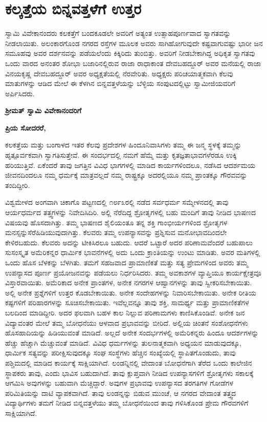 
\chapter{ಕಲ್ಕತ್ತೆಯ ಬಿನ್ನವತ್ತಳೆಗೆ ಉತ್ತರ}

ಸ್ವಾಮಿ ವಿವೇಕಾನಂದರು ಕಲಕತ್ತೆಗೆ ಬಂದಕೂಡಲೇ ಅವರಿಗೆ ಅತ್ಯಂತ ಉತ್ಸಾಹಪೂರ್ಣವಾದ ಸ್ವಾಗತವನ್ನು ನೀಡಲಾಯಿತು. ಅಲಂಕಾರಗೊಂಡ ನಗರದ ರಸ್ತೆಗಳ ಮೂಲಕ ಅವರು ಸಾಗಿಹೋಗುವುದೇ ಕಷ್ಟವಾಗುವಷ್ಟು ಭಾರೀ ಜನ ಸಮೂಹವು ಅವರ ದರ್ಶನವನ್ನು ಪಡೆಯಲೆಂದು ಕಿಕ್ಕಿರಿದು ತುಂಬಿತ್ತು. ಅವರಿಗೆ ನೀಡಬೇಕಾಗಿದ್ದ ಅಧಿಕೃತ ಸ್ವಾಗತವು ಒಂದು ವಾರದ ಅನಂತರ ಶೋಭಾ ಬಜಾರಿನಲ್ಲಿರುವ ರಾಜಾ ರಾಧಾಕಾಂತ ದೇವಬಹದ್ದೂರ್​ ಅವರ ಮನೆಯಲ್ಲಿ ರಾಜಾ ವಿನಯಕೃಷ್ಣ ದೇವಬಹದ್ದೂರ್​ ಅವರ ಅಧ್ಯಕ್ಷತೆಯಲ್ಲಿ ನೆರ\-ವೇರಿತು. ಅಧ್ಯಕ್ಷರು ಪರಿಚಯಾತ್ಮಕವಾಗಿ ಕೆಲವು ಮಾತುಗಳನ್ನು ಆಡಿದ ಮೇಲೆ ಈ ಕೆಳಗಿನ ಬಿನ್ನವತ್ತಳೆಯನ್ನು ಬೆಳ್ಳಿಯ ಸಂಪುಟದಲ್ಲಿಟ್ಟು ಸ್ವಾಮೀಜಿಯವರಿಗೆ ಅರ್ಪಿಸಿದರು.

\textbf{ಶ‍್ರೀಮತ್​ ಸ್ವಾಮಿ ವಿವೇಕಾನಂದರಿಗೆ}

\textbf{ಪ್ರಿಯ ಸೋದರರೆ,}

ಕಲಕತ್ತೆಯ ಮತ್ತು ಬಂಗಾಳದ ಇತರ ಕೆಲವು ಪ್ರದೇಶಗಳ ಹಿಂದೂನಿವಾಸಿಗಳು ತಮ್ಮ ಈ ಜನ್ಮ ಸ್ಥಳಕ್ಕೆ ತಮ್ಮನ್ನು ಹೃತ್ಪೂರ್ವಕವಾಗಿ ಸ್ವಾಗತಿಸುತ್ತೇವೆ. ಈ ಸಂದರ್ಭದಲ್ಲಿ ನಮಗೆ ಹೆಮ್ಮೆ ಮತ್ತು ಕೃತಜ್ಞತಾಭಾವಗಳೆರಡೂ ಉಕ್ಕಿ ಹರಿಯುತ್ತಿವೆ. ಏಕೆಂದರೆ ತಾವು ಜಗತ್ತಿನ ವಿವಿಧ ಭಾಗಗಳಲ್ಲಿ ಮಾಡಿದ ಕಾರ್ಯಗಳಿಂದಲೂ, ನಡೆಸಿದ ಆದರ್ಶಮಯ ಜೀವನದಿಂದಲೂ ನಮ್ಮ ಧರ್ಮಕ್ಕೆ ಮಾತ್ರವಲ್ಲದೆ ನಮ್ಮ ರಾಷ್ಟ್ರಕ್ಕೂ ಅದರಲ್ಲಿಯೂ ನಮ್ಮ ಪ್ರಾಂತಕ್ಕೂ ಗೌರವವನ್ನು ತಂದಿದ್ದೀರಿ.

ವಿಶ್ವಮೇಳದ ಅಂಗವಾಗಿ ಚಿಕಾಗೊ ಪಟ್ಟಣದಲ್ಲಿ ೧೮೯೩ರಲ್ಲಿ ನಡೆದ ಸರ್ವಧರ್ಮ ಸಮ್ಮೇಳನದಲ್ಲಿ ತಾವು ಆರ್ಯಧರ್ಮದ ತತ್ತ್ವಗಳನ್ನು ನಿವೇದಿಸಿದಿರಿ. ಅಲ್ಲಿ ನೆರೆದಿದ್ದ ಶ್ರೋತೃಗಳಲ್ಲಿ ಬಹು ಮಂದಿಗೆ ತಾವು ನೀಡಿದ ಭಾಷಣದ ವಿಷಯವು ಹೊಸದಾಗಿತ್ತು. ತಮ್ಮ ಭಾಷಣದ ಶೈಲಿಯಂತೂ ತನ್ನ ಶಕ್ತಿ ಗಾಂಭೀರ್ಯಗಳಿಂದ ಶ್ರೋತೃಗಳ ಮನಸ್ಸನ್ನು\break ಸೆರೆಹಿಡಿಯುವುದಾಗಿತ್ತು. ಕೆಲವರು ತಮ್ಮ ಉಪನ್ಯಾಸವನ್ನು ಪ್ರಶ್ನಿಸುವ ಮನೋಭಾವದಿಂದಲೇ ಕೇಳಿರಬಹುದು. ಕೆಲವರು ಅದನ್ನು ಟೀಕಿಸಿರಲೂ ಬಹುದು. ಆದರೆ ಒಟ್ಟಾರೆ ಅದರ ಪರಿಣಾಮವೆಂದರೆ ಬಹುಪಾಲು ಸುಸಂಸ್ಕೃತ ಅಮೆರಿಕನ್ನರ ಧಾರ್ಮಿಕ ಭಾವನೆಗಳಲ್ಲಿ ಅದು ಒಂದು ಕ್ರಾಂತಿಯನ್ನು ಉಂಟು ಮಾಡಿತು. ಅವರ ಮತಿಗಳಲ್ಲಿ ಒಂದು ಹೊಸ ಬೆಳಕನ್ನು ಬೆಳಗಿತು. ತಮಗೆ ಸಹಜವಾದ ಪ್ರಾಮಾಣಿಕತೆ ಮತ್ತು ಸತ್ಯ ಪ್ರೇಮಗಳಿಂದ ಅವರು ತಮ್ಮ ಉಪನ್ಯಾಸದ ಪೂರ್ಣ ಪ್ರಯೋಜನವನ್ನು ಪಡೆಯಲು ನಿರ್ಧರಿಸಿದರು. ತಮ್ಮ ಅವಕಾಶಗಳ ವ್ಯಾಪ್ತಿಯೂ ಕಾರ್ಯಕ್ಷೇತ್ರವೂ ವಿಸ್ತಾರವಾಯಿತು. ಅಮೆರಿಕಾದ ಅನೇಕ ಪ್ರಾಂತಗಳ, ಅನೇಕ ನಗರಗಳ ಆಹ್ವಾನಗಳನ್ನು ತಾವು ಸ್ವೀಕರಿಸಬೇಕಾಯಿತು. ಅಲ್ಲಿ ಅನೇಕ ಪ್ರಶ್ನೆಗಳಿಗೆ ಉತ್ತರ ಕೊಡಬೇಕಾಯಿತು. ಅನೇಕ ಸಂದೇಹಗಳನ್ನು ನಿವಾರಿಸ\-ಬೇಕಾಯಿತು. ಅನೇಕ ರೀತಿಯ ಕಷ್ಟಗಳಿಗೆ ಪರಿಹಾರಗಳನ್ನು ಸೂಚಿಸಬೇಕಾಯಿತು. ಇವೆಲ್ಲವನ್ನೂ ತಾವು ಶಕ್ತಿ, ಸಾಮರ್ಥ್ಯ ಮತ್ತು ಪ್ರಾಮಾಣಿಕತೆಗಳ ಬಲದಿಂದ ಮಾಡಿದ್ದೀರಿ. ಅದರ ಫಲವಾಗಿ ಬಹಳ ಕಾಲ ನಿಲ್ಲುವ ಪರಿಣಾಮಗಳು ಕಾಣಿಸಿಕೊಂಡಿವೆ. ಅನೇಕ ಜನ ವಿದ್ಯಾವಂತರ ಮೇಲೆ ತಮ್ಮ ಬೋಧನೆಯು ಆಳವಾದ ಪ್ರಭಾವವನ್ನು ಬೀರಿದೆ. ಅಲ್ಲಿಯ ಚಿಂತನೆ ಸಂಶೋಧನೆಗಳು ಹೊಸಹಾದಿಯನ್ನು ಹಿಡಿಯುವಂತೆ ಮಾಡಿದೆ. ಅಲ್ಲದೆ ಅನೇಕ ಸಂದರ್ಭಗಳಲ್ಲಿ ಅಮೆರಿಕನ್ನರು ಹಿಂದೂ ಆದರ್ಶಗಳನ್ನು ಹೆಚ್ಚು ಹೆಚ್ಚಾಗಿ ಮೆಚ್ಚುವಂತೆ ಮಾಡಿದೆ. ವಿವಿಧ ಧರ್ಮಗಳನ್ನು ತುಲನಾತ್ಮಕವಾಗಿ ಅಧ್ಯಯನ ಮಾಡುವುದಕ್ಕೂ, ಧಾರ್ಮಿಕ ಸತ್ಯವನ್ನು ಪರೀಕ್ಷಿಸುವುದಕ್ಕೂ ಸಂಘ ಸಂಸ್ಥೆಗಳು ಹೆಚ್ಚಿನ ಸಂಖ್ಯೆಯಲ್ಲಿ ಸ್ಥಾಪಿತ\-ಗೊಂಡುದು, ತಾವು ಪಶ್ಚಿಮದಲ್ಲಿ ಮಾಡಿದ ಕಾರ್ಯಕ್ಕೆ ಸಾಕ್ಷಿಯಾಗಿದೆ. ಲಂಡನ್ನಿನಲ್ಲಿ ವೇದಾಂತ ಬೋಧನೆಗಾಗಿ ತೆರೆದ ಒಂದು ಕಾಲೇಜಿನ ಸ್ಥಾಪಕರು ತಾವು, ಎಂದು ಭಾವಿಸ ಬಹುದಾಗಿದೆ. ತಾವು ಕ್ಲುಪ್ತವಾಗಿ ನೀಡಿದ ಉಪನ್ಯಾಸಗಳಿಗೆ ಶ್ರೋತೃಗಳು ಸಕಾಲಕ್ಕೆ ಆಗಮಿಸಿ ಅವುಗಳನ್ನು ಬಹುವಾಗಿ ಮೆಚ್ಚಿದ್ದಾರೆ. ಅವುಗಳ ಪ್ರಭಾವವು ಉಪನ್ಯಾಸದ ತರಗತಿಗಳ ಗೋಡೆಗಳ ಪರಿಮಿತಿಯನ್ನು ದಾಟಿ ವ್ಯಾಪಕವಾಗಿದೆ. ತಾವು ಲಂಡನ್ನನ್ನು ಬಿಡುವ ಮುಂಚೆ, ಆ ನಗರದ ವೇದಾಂತ ತತ್ತ್ವದ ವಿದ್ಯಾರ್ಥಿಗಳು ತಮಗೆ ನೀಡಿದ ಬಿನ್ನವತ್ತಳೆಯು ತಮ್ಮ ಬೋಧನೆಯಿಂದ ತಾವು ಗಳಿಸಿಕೊಂಡ ಪ್ರೇಮ ಗೌರವಗಳಿಗೆ ಸಾಕ್ಷಿಯಾಗಿದೆ.

